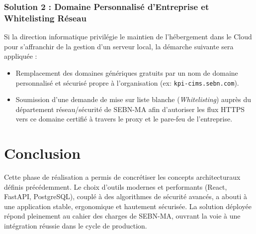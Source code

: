 \subsubsection{Solution 2 : Domaine Personnalisé d'Entreprise et Whitelisting Réseau}
Si la direction informatique privilégie le maintien de l'hébergement dans le Cloud pour s'affranchir de la gestion d'un serveur local, la démarche suivante sera appliquée :
\begin{itemize}
    \item Remplacement des domaines génériques gratuits par un nom de domaine personnalisé et sécurisé propre à l'organisation (ex: \texttt{kpi-cims.sebn.com}).
    \item Soumission d'une demande de mise sur liste blanche (\textit{Whitelisting}) auprès du département réseau/sécurité de SEBN-MA afin d'autoriser les flux HTTPS vers ce domaine certifié à travers le proxy et le pare-feu de l'entreprise.
\end{itemize}

\section*{Conclusion}
Cette phase de réalisation a permis de concrétiser les concepts architecturaux définis précédemment. Le choix d'outils modernes et performants (React, FastAPI, PostgreSQL), couplé à des algorithmes de sécurité avancés, a abouti à une application stable, ergonomique et hautement sécurisée. La solution déployée répond pleinement au cahier des charges de SEBN-MA, ouvrant la voie à une intégration réussie dans le cycle de production.